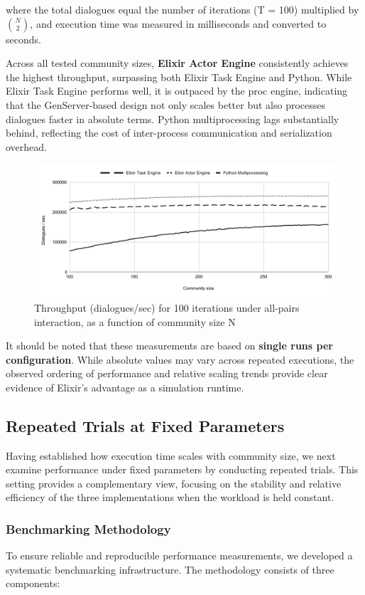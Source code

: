 \documentclass[
]{ceurart}
\begin{document}
where the total dialogues equal the number of iterations (T = 100) multiplied by $\binom{N}{2}$, and execution time was measured in milliseconds and converted to seconds.

Across all tested community sizes, \textbf{Elixir Actor Engine} consistently achieves the highest throughput, surpassing both Elixir Task Engine and Python. While Elixir Task Engine performs well, it is outpaced by the proc engine, indicating that the GenServer-based design not only scales better but also processes dialogues faster in absolute terms. Python multiprocessing lags substantially behind, reflecting the cost of inter-process communication and serialization overhead.

\begin{figure}
  \centering
  \includegraphics[width=\linewidth]{images/throughput_community_100-300.pdf} %
  \caption{Throughput (dialogues/sec) for 100 iterations under all-pairs interaction, as a function of community size N}
\end{figure}


It should be noted that these measurements are based on \textbf{single runs per configuration}. While absolute values may vary across repeated executions, the observed ordering of performance and relative scaling trends provide clear evidence of Elixir's advantage as a simulation runtime.


\subsection{Repeated Trials at Fixed Parameters}
Having established how execution time scales with community size, we next examine performance under fixed parameters by conducting repeated trials. This setting provides a complementary view, focusing on the stability and relative efficiency of the three implementations when the workload is held constant.

\subsubsection{Benchmarking Methodology}
To ensure reliable and reproducible performance measurements, we developed a systematic benchmarking infrastructure. The methodology consists of three components:
\end{document}
